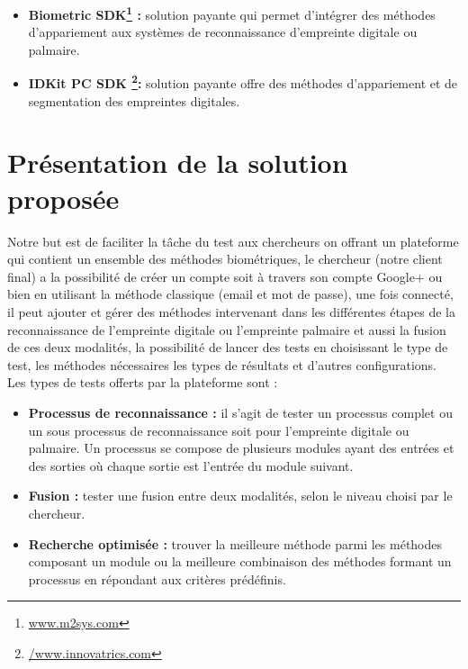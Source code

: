 \begin{itemize}
	\item \textbf{
Biometric SDK\footnote{\href{http://www.m2sys.com/}{www.m2sys.com}} :} solution payante qui permet d'intégrer des méthodes d'appariement aux systèmes de reconnaissance d'empreinte digitale ou palmaire.

	\item \textbf{IDKit PC SDK \footnote{\href{https://www.innovatrics.com/idkit-fingerprint-sdk/}{/www.innovatrics.com}}:} solution payante offre des méthodes d’appariement et de segmentation des empreintes digitales.


\end{itemize}




\section{Présentation de la solution proposée }
Notre but est de faciliter la tâche du test aux chercheurs on offrant un plateforme qui contient un ensemble des méthodes biométriques, le chercheur (notre client final) a la possibilité de créer un compte soit à travers son compte Google+ ou bien en utilisant la méthode classique (email et mot de passe), une fois connecté, il peut ajouter et gérer des méthodes intervenant dans les différentes étapes de la reconnaissance de l'empreinte digitale ou l'empreinte palmaire et aussi la fusion de ces deux modalités, la possibilité de lancer des tests en choisissant le type de test, les méthodes nécessaires les types de résultats et d'autres configurations.
\\ Les types de tests offerts par la plateforme sont :
\begin{itemize}
\item \textbf{Processus de reconnaissance :} il s'agit de tester un processus complet ou un sous processus de reconnaissance soit pour l'empreinte digitale ou palmaire. Un processus se compose de plusieurs modules ayant des entrées et des sorties où chaque sortie est l'entrée du module suivant.

\item \textbf{Fusion :} tester une fusion entre deux modalités, selon le niveau choisi par le chercheur.

 \item \textbf{Recherche optimisée :} trouver la meilleure méthode parmi les méthodes composant un module ou la meilleure combinaison des méthodes formant un processus en répondant aux critères prédéfinis.
\end{itemize}
